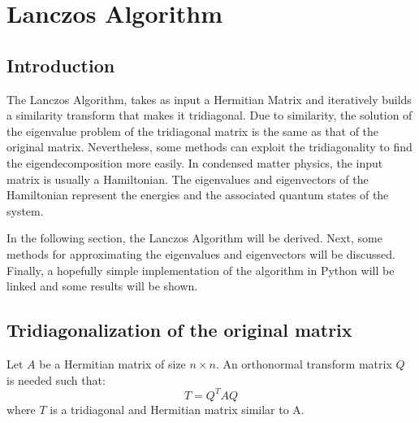 \section{Lanczos Algorithm}
\label{app:lanczos}

\subsection{Introduction}

The Lanczos Algorithm, takes as input a Hermitian Matrix and iteratively builds a similarity transform that makes it tridiagonal. Due to similarity, the solution of the eigenvalue problem of the tridiagonal matrix is the same as that of the original matrix. Nevertheless, some methods can exploit the tridiagonality to find the eigendecomposition more easily. In condensed matter physics, the input matrix is usually a Hamiltonian. The eigenvalues and eigenvectors of the Hamiltonian represent the energies and the associated quantum states of the system. 

In the following section, the Lanczos Algorithm will be derived. Next, some methods for approximating the eigenvalues and eigenvectors will be discussed. Finally, a hopefully simple implementation of the algorithm in Python will be linked and some results will be shown.

\subsection{Tridiagonalization of the original matrix}

Let $A$ be a Hermitian matrix of size $n \times n$. An orthonormal transform matrix $Q$ is needed such that:
%
\begin{equation}
T = Q^{T}AQ 
\end{equation}
%
where $T$ is a tridiagonal and Hermitian matrix similar to A.

